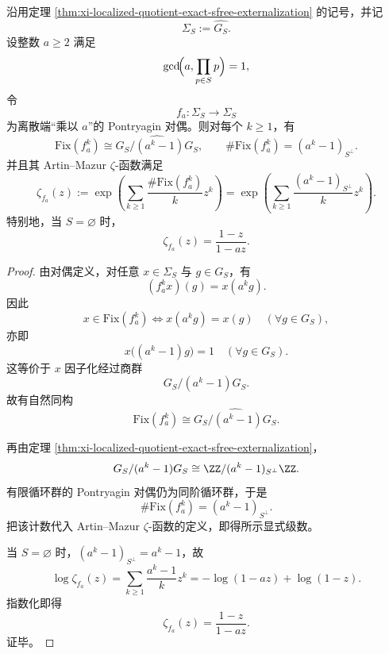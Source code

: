 \begin{theorem}\label{thm:xi-localized-solenoid-fixedpoints-artin-mazur-series}
沿用定理 \ref{thm:xi-localized-quotient-exact-sfree-externalization} 的记号，并记
\[
\Sigma_S:=\widehat{G_S}.
\]
设整数 \(a\ge 2\) 满足
\[
\gcd\!\Bigl(a,\prod_{p\in S}p\Bigr)=1,
\]
令
\[
f_a:\Sigma_S\longrightarrow \Sigma_S
\]
为离散端“乘以 \(a\)”的 Pontryagin 对偶。则对每个 \(k\ge 1\)，有
\[
\boxed{\;
\mathrm{Fix}(f_a^k)\cong \widehat{G_S/(a^k-1)G_S},
\qquad
\#\mathrm{Fix}(f_a^k)=(a^k-1)_{S^\perp}.\;}
\]
并且其 Artin--Mazur \(\zeta\)-函数满足
\[
\boxed{\;
\zeta_{f_a}(z)
:=
\exp\!\left(
\sum_{k\ge 1}\frac{\#\mathrm{Fix}(f_a^k)}{k}z^k
\right)
=
\exp\!\left(
\sum_{k\ge 1}\frac{(a^k-1)_{S^\perp}}{k}z^k
\right).\;}
\]
特别地，当 \(S=\varnothing\) 时，
\[
\boxed{\;
\zeta_{f_a}(z)=\frac{1-z}{1-az}.\;}
\]
\end{theorem}
\begin{proof}
由对偶定义，对任意 \(x\in \Sigma_S\) 与 \(g\in G_S\)，有
\[
(f_a^k x)(g)=x(a^k g).
\]
因此
\[
x\in \mathrm{Fix}(f_a^k)
\iff
x(a^k g)=x(g)\quad(\forall g\in G_S),
\]
亦即
\[
x\bigl((a^k-1)g\bigr)=1\quad(\forall g\in G_S).
\]
这等价于 \(x\) 因子化经过商群
\[
G_S/(a^k-1)G_S.
\]
故有自然同构
\[
\mathrm{Fix}(f_a^k)\cong \widehat{G_S/(a^k-1)G_S}.
\]

再由定理 \ref{thm:xi-localized-quotient-exact-sfree-externalization}，
\[
G_S/(a^k-1)G_S\cong \ZZ/(a^k-1)_{S^\perp}\ZZ.
\]
有限循环群的 Pontryagin 对偶仍为同阶循环群，于是
\[
\#\mathrm{Fix}(f_a^k)=(a^k-1)_{S^\perp}.
\]
把该计数代入 Artin--Mazur \(\zeta\)-函数的定义，即得所示显式级数。

当 \(S=\varnothing\) 时，\((a^k-1)_{S^\perp}=a^k-1\)，故
\[
\log\zeta_{f_a}(z)
=
\sum_{k\ge 1}\frac{a^k-1}{k}z^k
=
-\log(1-az)+\log(1-z).
\]
指数化即得
\[
\zeta_{f_a}(z)=\frac{1-z}{1-az}.
\]
证毕。
\end{proof}

